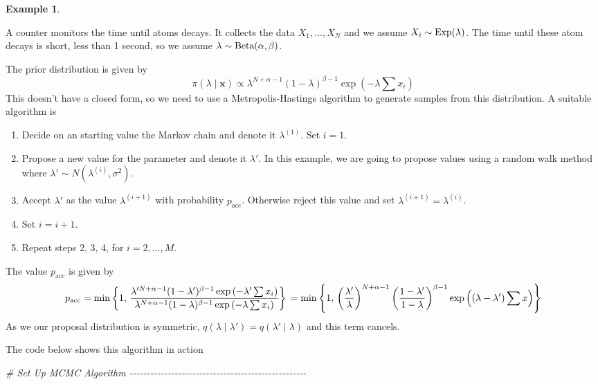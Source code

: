 \documentclass[
]{book}
\newenvironment{Shaded}{\begin{snugshade}}{\end{snugshade}}
\newcommand{\CommentTok}[1]{\textcolor[rgb]{0.56,0.35,0.01}{\textit{#1}}}
\providecommand{\tightlist}{%
  \setlength{\itemsep}{0pt}\setlength{\parskip}{0pt}}
\theoremstyle{definition}
\theoremstyle{definition}
\newtheorem{example}{Example}[chapter]
\theoremstyle{definition}
\theoremstyle{definition}
\theoremstyle{remark}
\begin{document}
\begin{example}
\protect\hypertarget{exm:norm}{}\label{exm:norm}

A counter monitors the time until atoms decays. It collects the data \(X_1, \ldots, X_N\) and we assume \(X_i \sim \hbox{Exp}(\lambda)\). The time until these atom decays is short, less than 1 second, so we assume \(\lambda \sim \hbox{Beta}(\alpha, \beta)\).

The prior distribution is given by
\[
\pi(\lambda \mid \boldsymbol{x}) \propto \lambda^{N + \alpha - 1} (1 - \lambda)^{\beta - 1}\exp\left(-\lambda \sum x_i\right)
\]
This doesn't have a closed form, so we need to use a Metropolis-Hastings algorithm to generate samples from this distribution. A suitable algorithm is

\begin{enumerate}
\def\labelenumi{\arabic{enumi}.}
\tightlist
\item
  Decide on an starting value the Markov chain and denote it \(\lambda^{(1)}\). Set \(i = 1\).
\item
  Propose a new value for the parameter and denote it \(\lambda'\). In this example, we are going to propose values using a random walk method where \(\lambda' \sim N(\lambda^{(i)}, \sigma^2)\).
\item
  Accept \(\lambda'\) as the value \(\lambda^{(i+1)}\) with probability \(p_{\textrm{acc}}\). Otherwise reject this value and set \(\lambda^{(i+1)} = \lambda^{(i)}\).\\
\item
  Set \(i = i + 1\).
\item
  Repeat steps 2, 3, 4, for \(i = 2, \ldots, M\).
\end{enumerate}

The value \(p_{\textrm{acc}}\) is given by
\[
p_{\textrm{acc}} = \min \left\{1, \, \frac{\lambda'^{N + \alpha - 1} (1 - \lambda')^{\beta - 1}\exp\left(-\lambda' \sum x_i\right)}{\lambda^{N + \alpha - 1} (1 - \lambda)^{\beta - 1}\exp\left(-\lambda \sum x_i\right)}\right\} \\
= \min \left\{1, \, \left(\frac{\lambda'}{\lambda}\right)^{N + \alpha - 1} \left(\frac{1-\lambda'}{1-\lambda}\right)^{\beta -1} \exp\left((\lambda- \lambda')\sum x\right)\right\} 
\]
As we our proposal distribution is symmetric, \(q(\lambda \mid \lambda') = q(\lambda' \mid \lambda)\) and this term cancels.

The code below shows this algorithm in action

\begin{Shaded}
\begin{Highlighting}[]
\CommentTok{\# Set Up MCMC Algorithm {-}{-}{-}{-}{-}{-}{-}{-}{-}{-}{-}{-}{-}{-}{-}{-}{-}{-}{-}{-}{-}{-}{-}{-}{-}{-}{-}{-}{-}{-}{-}{-}{-}{-}{-}{-}{-}{-}{-}{-}{-}{-}{-}{-}{-}{-}{-}{-}{-}{-}{-}}


\end{Highlighting}
\end{Shaded}
\end{example}
\end{document}
